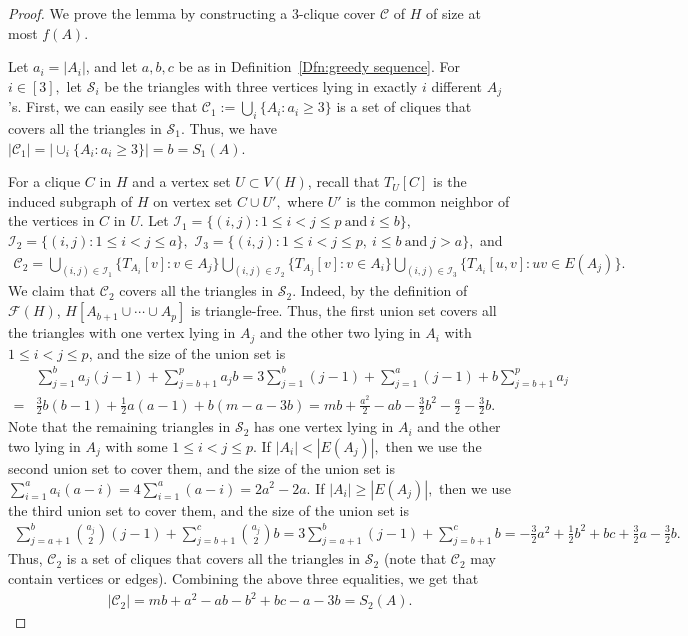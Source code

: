 \documentclass[10pt,a4paper]{amsart}
\newcommand{\dC}{{\mathcal{C}}}
\newcommand{\dF}{{\mathcal{F}}}
\newcommand{\dS}{{\mathcal{S}}}
\begin{document}
\begin{proof}
We prove the lemma by constructing a 3-clique cover $\dC$ of $H$ of size at most $f(A).$

Let $a_i = |A_i|$, and let $a,b,c$ be as in Definition~\ref{Dfn:greedy sequence}. 
For $i\in[3],$ let $\dS_i$ be the triangles with three vertices lying in exactly $i$ different $A_j$'s.
First, we can easily see that  $\dC_1:=\bigcup_{i}\{A_i: a_i\geq 3\}$ is a set of cliques that covers all the triangles in $\dS_1.$
Thus, we have $|\dC_1|=|\cup_{i}\{A_i: a_i\geq 3\}|=b=S_1(A).$

For a clique $C$ in $H$ and a vertex set $U\subset V(H)$, recall that $T_U[C]$ is the induced subgraph of $H$ on vertex set $C\cup U',$ where $U'$ is the common neighbor of the vertices in $C$ in $U.$   
Let $\mathcal{I}_1=\{(i,j): 1\le i<j\le p\ \text{and}\ i\le b \},$
    $\mathcal{I}_2=\{(i,j): 1\le i<j\le a\},$ 
    $\mathcal{I}_3=\{(i,j): 1\le i<j\le p,\ i\le b\ \text{and}\ j>a\},$ and 
\begin{align*}
\dC_2=\bigcup\limits_{(i,j)\in\mathcal{I}_1} \{T_{A_i}[v]: v\in A_j\}
      \bigcup\limits_{(i,j)\in\mathcal{I}_2} \{T_{A_j}[v]: v\in A_i\}
      \bigcup\limits_{(i,j)\in\mathcal{I}_3} \{T_{A_i}[u,v]: uv \in E(A_j)\}.
\end{align*}
We claim that $\dC_2$ covers all the triangles in $\dS_2.$ 
Indeed, by %
the definition of $\dF(H)$, $H[A_{b+1}\cup\cdots\cup A_p]$ is triangle-free.
Thus, the first union set covers all the triangles with one vertex lying in $A_j$ and the other two lying in $A_i$ with $1\leq i<j\leq p$, and the size of the union set is 
\begin{align*}
&\sum_{j=1}^ba_j(j-1)+\sum_{j=b+1}^pa_jb=3\sum_{j=1}^b (j-1)+\sum_{j=1}^a (j-1)+b\sum_{j=b+1}^pa_j \nonumber \\
=&\frac{3}{2}b(b-1)+\frac{1}{2}a(a-1)+b(m-a-3b)=
mb+\frac{a^2}{2}-ab-\frac{3}{2}b^2-\frac {a}{2}-\frac{3}{2}b.
\end{align*} 
Note that the remaining triangles in $\dS_2$ has one vertex lying in $A_i$ and the other two lying in $A_j$ with some $1\le i<j\le p$.
If $|A_i|<|E(A_j)|,$ then we use the second union set to cover them,
and the size of the union set is
$\sum_{i=1}^{a}a_i(a-i)=4\sum_{i=1}^{a}(a-i)=2a^2-2a.$
If $|A_i|\ge |E(A_j)|,$ then we use the third union set to cover them,
and the size of the union set is
\begin{align*}
\sum_{j=a+1}^b\binom{a_j}{2}(j-1)+\sum_{j=b+1}^c\binom{a_j}{2}b
=3\sum_{j=a+1}^b (j-1)+\sum_{j=b+1}^c b=-\frac{3}{2}a^2+ \frac{1}{2}b^2 +bc +\frac 3 2a-\frac 3 2 b.
\end{align*}
Thus, $\dC_2$ is a set of cliques that covers all the triangles in $\dS_2$ (note that $\dC_2$ may contain vertices or edges).
Combining the above three equalities, we get that 
\begin{align*}
    |\dC_2|= mb+a^2-ab-b^2+bc-a-3b=S_2(A).
\end{align*}
    

\end{proof}
\end{document}
